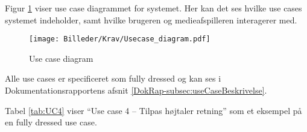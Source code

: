 Figur \ref{fig:useCaseDiagram} viser use case diagrammet for systemet.
\newline Her kan det ses hvilke use cases systemet indeholder, samt hvilke brugeren og medieafspilleren interagerer med.

\begin{figure}[ht]
\centering
\texttt{[image: Billeder/Krav/Usecase\_diagram.pdf]}
\caption{Use case diagram}
\label{fig:useCaseDiagram}
\end{figure}

Alle use cases er specificeret som fully dressed og kan ses i Dokumentationsrapportens afsnit \vref{DokRap-subsec:useCaseBeskrivelse}.

Tabel \ref{tab:UC4} viser ``Use case 4 -- Tilpas højtaler retning'' som et eksempel på en fully dressed use case.

